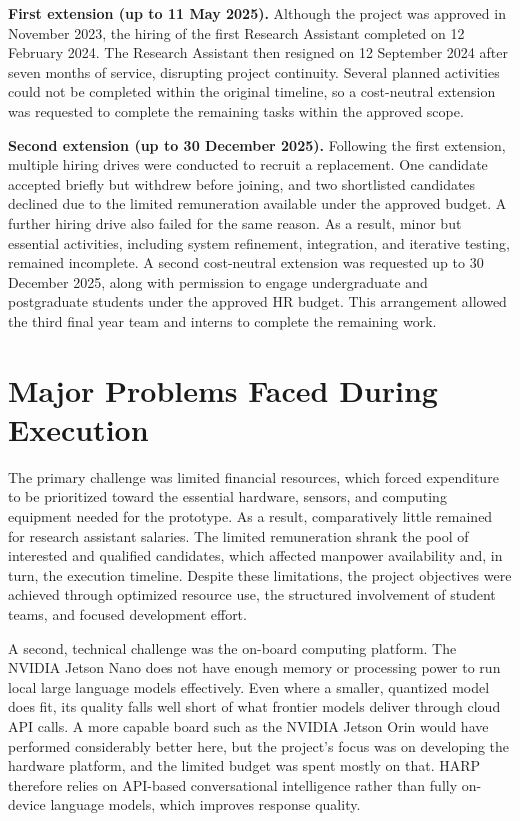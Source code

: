 \documentclass[11pt,a4paper]{article}
\begin{document}
\textbf{First extension (up to 11 May 2025).} Although the project was approved in November 2023, the hiring of the first Research Assistant completed on 12 February 2024. The Research Assistant then resigned on 12 September 2024 after seven months of service, disrupting project continuity. Several planned activities could not be completed within the original timeline, so a cost-neutral extension was requested to complete the remaining tasks within the approved scope.

\textbf{Second extension (up to 30 December 2025).} Following the first extension, multiple hiring drives were conducted to recruit a replacement. One candidate accepted briefly but withdrew before joining, and two shortlisted candidates declined due to the limited remuneration available under the approved budget. A further hiring drive also failed for the same reason. As a result, minor but essential activities, including system refinement, integration, and iterative testing, remained incomplete. A second cost-neutral extension was requested up to 30 December 2025, along with permission to engage undergraduate and postgraduate students under the approved HR budget. This arrangement allowed the third final year team and interns to complete the remaining work.

\pagebreak
\section{Major Problems Faced During Execution}

The primary challenge was limited financial resources, which forced expenditure to be prioritized toward the essential hardware, sensors, and computing equipment needed for the prototype. As a result, comparatively little remained for research assistant salaries. The limited remuneration shrank the pool of interested and qualified candidates, which affected manpower availability and, in turn, the execution timeline. Despite these limitations, the project objectives were achieved through optimized resource use, the structured involvement of student teams, and focused development effort.

A second, technical challenge was the on-board computing platform. The NVIDIA Jetson Nano does not have enough memory or processing power to run local large language models effectively. Even where a smaller, quantized model does fit, its quality falls well short of what frontier models deliver through cloud API calls. A more capable board such as the NVIDIA Jetson Orin would have performed considerably better here, but the project's focus was on developing the hardware platform, and the limited budget was spent mostly on that. HARP therefore relies on API-based conversational intelligence rather than fully on-device language models, which improves response quality.
\end{document}
